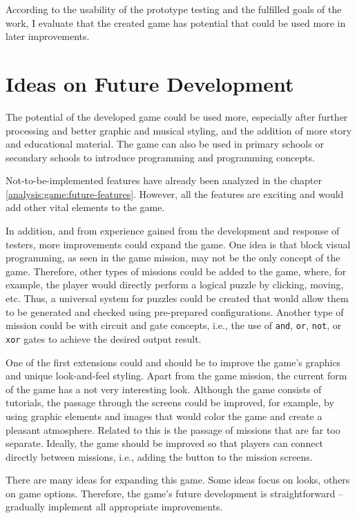 \begin{conclusion}
According to the usability of the prototype testing and the fulfilled goals of the work, I evaluate that the created game has potential that could be used more in later improvements.

\section{Ideas on Future Development}

The potential of the developed game could be used more, especially after further processing and better graphic and musical styling, and the addition of more story and educational material.
The game can also be used in primary schools or secondary schools to introduce programming and programming concepts.

Not-to-be-implemented features have already been analyzed in the chapter \ref{analysis:game:future-features}.
However, all the features are exciting and would add other vital elements to the game.

In addition, and from experience gained from the development and response of testers, more improvements could expand the game.
One idea is that block visual programming, as seen in the game mission, may not be the only concept of the game.
Therefore, other types of missions could be added to the game, where, for example, the player would directly perform a logical puzzle by clicking, moving, etc.
Thus, a universal system for puzzles could be created that would allow them to be generated and checked using pre-prepared configurations.
Another type of mission could be with circuit and gate concepts, i.e., the use of \texttt{and}, \texttt{or}, \texttt{not}, or \texttt{xor} gates to achieve the desired output result.

One of the first extensions could and should be to improve the game's graphics and unique look-and-feel styling.
Apart from the game mission, the current form of the game has a not very interesting look.
Although the game consists of tutorials, the passage through the screens could be improved, for example, by using graphic elements and images that would color the game and create a pleasant atmosphere.
Related to this is the passage of missions that are far too separate.
Ideally, the game should be improved so that players can connect directly between missions, i.e., adding the  button to the mission screens.

There are many ideas for expanding this game.
Some ideas focus on looks, others on game options.
Therefore, the game's future development is straightforward -- gradually implement all appropriate improvements.

\end{conclusion}
